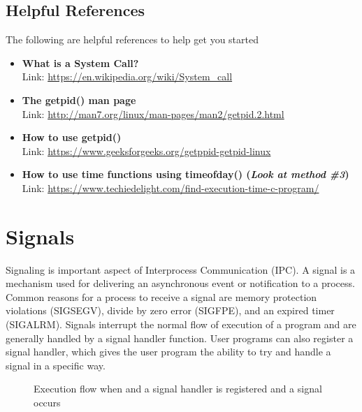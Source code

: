 \documentclass{article}
\begin{document}
\subsection*{Helpful References}
The following are helpful references to help get you started
\begin{itemize}
\item \textbf{What is a System Call?} \\
Link:  \href{https://en.wikipedia.org/wiki/System_call}{https://en.wikipedia.org/wiki/System\_call}
\item \textbf{The getpid() man page} \\
Link:  \href{http://man7.org/linux/man-pages/man2/getpid.2.html}{http://man7.org/linux/man-pages/man2/getpid.2.html}
\item \textbf{How to use getpid()}\\
Link:  \href{https://www.geeksforgeeks.org/getppid-getpid-linux}{https://www.geeksforgeeks.org/getppid-getpid-linux}
\item \textbf{How to use time functions using timeofday() (\textit{Look at method \#3})}\\
Link: \href{https://www.techiedelight.com/find-execution-time-c-program/}{https://www.techiedelight.com/find-execution-time-c-program/}
\end{itemize}


\section{Signals}
Signaling is important aspect of Interprocess Communication (IPC). A signal is a mechanism used for delivering an asynchronous event or notification to a process. Common reasons for a process to receive a signal are memory protection violations (SIGSEGV), divide by zero error (SIGFPE), and an expired timer (SIGALRM). Signals interrupt the normal flow of execution of a program and are generally handled by a signal handler function. User programs can also register a signal handler, which gives the user program the ability to try and handle a signal in a specific way.

 \begin{figure}[!htb]
        \captionsetup{justification=centering}
        \caption{Execution flow when and a signal handler is registered and a signal occurs}
\end{figure}
\end{document}
